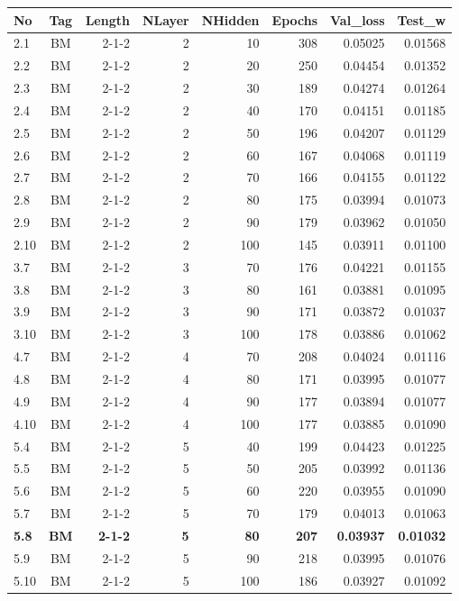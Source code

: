 \documentclass[a4paper, magyar]{article}
\begin{document}
\begin{small}
\begin{table}[tp]\centering
	\begin{tabular}{|l|c|r|r|r|r|r|r|}
		\hline
		No&Tag&Length&NLayer&NHidden&Epochs&Val\_loss&Test\_w\\
		\hline\hline
		2.1&BM&2-1-2&2&10&308&0.05025&0.01568\\
		\hline
		2.2&BM&2-1-2&2&20&250&0.04454&0.01352\\
		\hline
		2.3&BM&2-1-2&2&30&189&0.04274&0.01264\\
		\hline
		2.4&BM&2-1-2&2&40&170&0.04151&0.01185\\
		\hline
		2.5&BM&2-1-2&2&50&196&0.04207&0.01129\\
		\hline
		2.6&BM&2-1-2&2&60&167&0.04068&0.01119\\
		\hline
		2.7&BM&2-1-2&2&70&166&0.04155&0.01122\\
		\hline
		2.8&BM&2-1-2&2&80&175&0.03994&0.01073\\
		\hline
		2.9&BM&2-1-2&2&90&179&0.03962&0.01050\\
		\hline
		2.10&BM&2-1-2&2&100&145&0.03911&0.01100\\
		\hline
		3.7&BM&2-1-2&3&70&176&0.04221&0.01155\\
		\hline
		3.8&BM&2-1-2&3&80&161&0.03881&0.01095\\
		\hline
		3.9&BM&2-1-2&3&90&171&0.03872&0.01037\\
		\hline
		3.10&BM&2-1-2&3&100&178&0.03886&0.01062\\
		\hline
		4.7&BM&2-1-2&4&70&208&0.04024&0.01116\\
		\hline
		4.8&BM&2-1-2&4&80&171&0.03995&0.01077\\
		\hline
		4.9&BM&2-1-2&4&90&177&0.03894&0.01077\\
		\hline
		4.10&BM&2-1-2&4&100&177&0.03885&0.01090\\
		\hline
		5.4&BM&2-1-2&5&40&199&0.04423&0.01225\\
		\hline
		5.5&BM&2-1-2&5&50&205&0.03992&0.01136\\
		\hline
		5.6&BM&2-1-2&5&60&220&0.03955&0.01090\\
		\hline
		5.7&BM&2-1-2&5&70&179&0.04013&0.01063\\
		\hline
		\textbf{5.8}&\textbf{BM}&\textbf{2-1-2}&\textbf{5}&\textbf{80}&\textbf{207}&\textbf{0.03937}&\textbf{0.01032}\\
		\hline
		5.9&BM&2-1-2&5&90&218&0.03995&0.01076\\
		\hline
		5.10&BM&2-1-2&5&100&186&0.03927&0.01092\\

\end{tabular}
\end{table}
\end{small}
\end{document}
